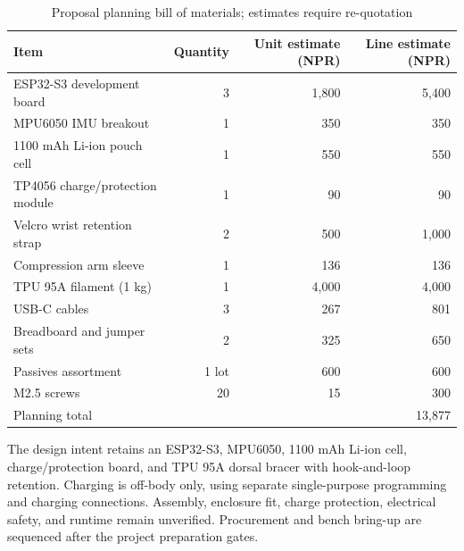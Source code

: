 \begin{table}[H]
\centering\small
\caption{Proposal planning bill of materials; estimates require re-quotation}
\label{tab:planning-bom}
\begin{tabular}{p{4cm}r r r}
\hline
Item & Quantity & Unit estimate (NPR) & Line estimate (NPR) \\
\hline
ESP32-S3 development board & 3 & 1,800 & 5,400 \\
MPU6050 IMU breakout & 1 & 350 & 350 \\
1100 mAh Li-ion pouch cell & 1 & 550 & 550 \\
TP4056 charge/protection module & 1 & 90 & 90 \\
Velcro wrist retention strap & 2 & 500 & 1,000 \\
Compression arm sleeve & 1 & 136 & 136 \\
TPU 95A filament (1 kg) & 1 & 4,000 & 4,000 \\
USB-C cables & 3 & 267 & 801 \\
Breadboard and jumper sets & 2 & 325 & 650 \\
Passives assortment & 1 lot & 600 & 600 \\
M2.5 screws & 20 & 15 & 300 \\
\hline
Planning total & & & 13,877 \\
\hline
\end{tabular}
\end{table}

The design intent retains an ESP32-S3, MPU6050, 1100 mAh Li-ion cell, charge/protection board, and TPU 95A dorsal bracer with hook-and-loop retention. Charging is off-body only, using separate single-purpose programming and charging connections. Assembly, enclosure fit, charge protection, electrical safety, and runtime remain unverified. Procurement and bench bring-up are sequenced after the project preparation gates.

